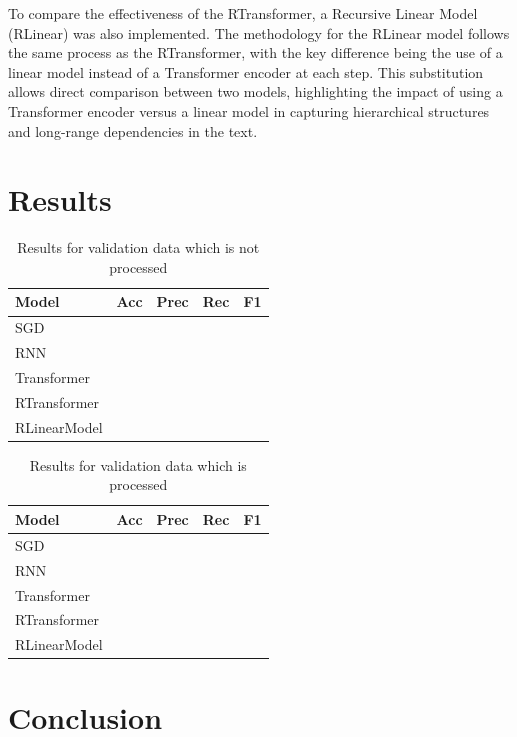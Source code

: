\documentclass[10pt, a4paper]{article}
\begin{document}
To compare the effectiveness of the RTransformer, a Recursive Linear Model (RLinear) was also implemented. The methodology for the RLinear model follows the same process as the RTransformer, with the key difference being the use of a linear model instead of a Transformer encoder at each step. This substitution allows direct comparison between two models, highlighting the impact of using a Transformer encoder versus a linear model in capturing hierarchical structures and long-range dependencies in the text. 

\section{Results}
\begin{table}[H]
\caption{Results for validation data which is not processed}
\label{tab:not processed data}
\begin{center}
\begin{tabular}{llccc}
\toprule
Model & Acc & Prec & Rec & F1 \\
\midrule
SGD & & & & \\
RNN & & & & \\
Transformer & & & & \\
RTransformer & & & & \\
RLinearModel & & & & \\
\bottomrule
\end{tabular}
\end{center}
\end{table}

\begin{table}[H]
\caption{Results for validation data which is processed}
\label{tab:processed data}
\begin{center}
\begin{tabular}{llccc}
\toprule
Model & Acc & Prec & Rec & F1 \\
\midrule
SGD & & & & \\
RNN & & & & \\
Transformer & & & & \\
RTransformer & & & & \\
RLinearModel & & & & \\
\bottomrule
\end{tabular}
\end{center}
\end{table}

\section{Conclusion}
\end{document}
